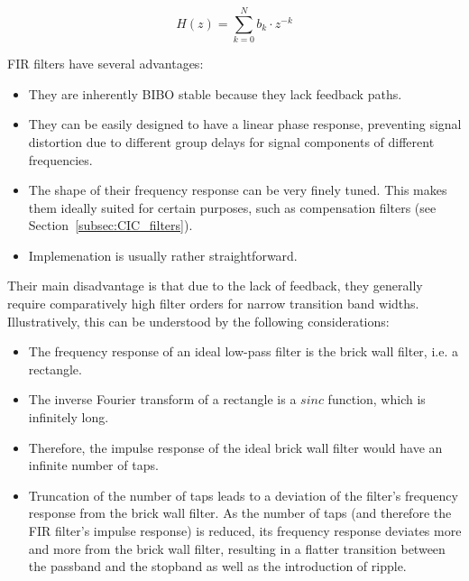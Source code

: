 \begin{equation}
    \label{eq:fir_filter}
    H(z) = \sum_{k=0}^{N} b_k \cdot z^{-k}
\end{equation}

FIR filters have several advantages:

\begin{itemize}\tightlist
    \item
        They are inherently BIBO stable because they lack feedback paths.
    \item
        They  can  be  easily  designed  to  have  a  linear  phase  response,
        preventing signal distortion due to  different group delays for signal
        components of different frequencies.
    \item
        The shape of  their frequency response can be  very finely tuned. This
        makes them ideally  suited for certain purposes,  such as compensation
        filters (see Section~\ref{subsec:CIC_filters}).
    \item
        Implemenation is usually rather straightforward.
\end{itemize}

Their  main  disadvantage   is  that  due  to  the  lack   of  feedback,  they
generally require comparatively high filter  orders for narrow transition band
widths. Illustratively, this can be understood by the following considerations:
\begin{itemize}\tightlist
    \item
        The frequency response of an ideal low-pass filter is the brick wall
        filter, i.e. a rectangle.
    \item
        The inverse  Fourier transform  of a rectangle  is a  $sinc$ function,
        which is infinitely long.
    \item
        Therefore, the impulse  response of the ideal brick  wall filter would
        have an infinite number of taps.
    \item
        Truncation of the number of taps  leads to a deviation of the filter's
        frequency response from the brick wall  filter.  As the number of taps
        (and  therefore the  FIR filter's  impulse response)  is reduced,  its
        frequency response deviates more and  more from the brick wall filter,
        resulting  in  a  flatter  transition between  the  passband  and  the
        stopband as well as the introduction of ripple.
\end{itemize}

